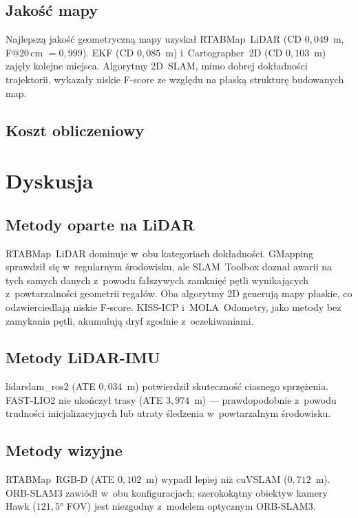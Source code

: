 \subsection{Jakość mapy}

Najlepszą jakość geometryczną mapy uzyskał RTABMap~LiDAR
(CD $0{,}049$~m, F@20\,cm $= 0{,}999$).
EKF (CD $0{,}085$~m) i~Cartographer~2D (CD $0{,}103$~m) zajęły kolejne miejsca.
Algorytmy 2D~SLAM, mimo dobrej dokładności trajektorii, wykazały niskie F-score
ze względu na płaską strukturę budowanych map.

\subsection{Koszt obliczeniowy}


\section{Dyskusja}

\subsection{Metody oparte na LiDAR}

RTABMap~LiDAR dominuje w~obu kategoriach dokładności.
GMapping sprawdził się w~regularnym środowisku, ale SLAM~Toolbox doznał awarii
na tych samych danych z~powodu fałszywych zamknięć pętli wynikających
z~powtarzalności geometrii regałów.
Oba algorytmy 2D generują mapy płaskie, co odzwierciedlają niskie F-score.
KISS-ICP i~MOLA~Odometry, jako metody bez zamykania pętli, akumulują dryf
zgodnie z~oczekiwaniami.

\subsection{Metody LiDAR-IMU}

lidarslam\_ros2 (ATE $0{,}034$~m) potwierdził skuteczność ciasnego sprzężenia.
FAST-LIO2 nie ukończył trasy (ATE $3{,}974$~m) --- prawdopodobnie z~powodu
trudności inicjalizacyjnych lub utraty śledzenia w~powtarzalnym środowisku.

\subsection{Metody wizyjne}

RTABMap~RGB-D (ATE $0{,}102$~m) wypadł lepiej niż cuVSLAM ($0{,}712$~m).
ORB-SLAM3 zawiódł w~obu konfiguracjach; szerokokątny obiektyw kamery Hawk
($121{,}5°$ FOV) jest niezgodny z~modelem optycznym ORB-SLAM3.

